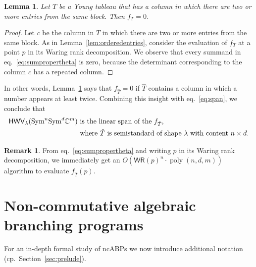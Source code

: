 \documentclass[10pt,a4paper]{article}
\numberwithin{equation}{section}
\newtheorem{lemma}[equation]{Lemma}
\theoremstyle{definition}
\newtheorem{remark}[equation]{Remark}
\newcommand{\Sym}{\textup{Sym}}
\newcommand{\HWV}{\mathsf{HWV}}
\newcommand{\IC}{\mathbb{C}}
\newcommand{\la}{\lambda}
\newcommand{\WR}{{\mathsf{WR}}}
\DeclareMathOperator{\poly}{poly}
\begin{document}
\begin{lemma}\label{lem:nodoubleentry}
Let $T$ be a Young tableau that has a column in which there are two or more entries from the same block. Then $f_T=0$.
\end{lemma}
\begin{proof}
Let $c$ be the column in $T$ in which there are two or more entries from the same block.
As in Lemma~\ref{lem:orderedentries}, consider the evaluation of $f_T$ at a point $p$ in its Waring rank decomposition. We observe that every summand in eq.~\eqref{eq:sumpropertheta} is zero, because the determinant corresponding to the column $c$ has a repeated column.
\end{proof}

In other words, Lemma~\ref{lem:nodoubleentry} says that $f_{\hat T}=0$ if $\hat T$ contains a column in which a number appears at least twice.
Combining this insight with eq.~\eqref{eq:span}, we conclude that
\begin{equation}\label{eq:spanssyt}
\begin{split}
\HWV_\la(\Sym^n\Sym^d \IC^m) & \text{ is the linear span of the $f_{\hat T}$,} \\
& \text{ where $\hat T$ is semistandard of shape $\la$ with content $n \times d$.}
\end{split}
\end{equation}

\begin{remark}
\label{rem:waringevaluation}
From eq.~\ref{eq:sumpropertheta} and writing $p$ in its Waring rank decomposition, we immediately get an $O(\WR(p)^n \cdot \poly(n,d,m))$ algorithm to evaluate $f_{\hat T}(p)$.
\end{remark}


%
%
%
%
%
%
%
%
%
%
%
%
%
%
%
%
%
%
%
%
%
%
%
%
%
%
%
%
%
%
%
%
%
%
%
%
%
%
%
%
%
%
%
%
%
%
%
%
%
%
%
%
%
%
%
%
%
%
%
%
%
%
%
%
%
%
%
%

%
%
%
%
%
%
%
%

\section{Non-commutative algebraic branching programs}
\label{sec:abp}
For an in-depth formal study of ncABPs we now introduce additional notation (cp.~Section~\ref{sec:prelude}).
\end{document}
